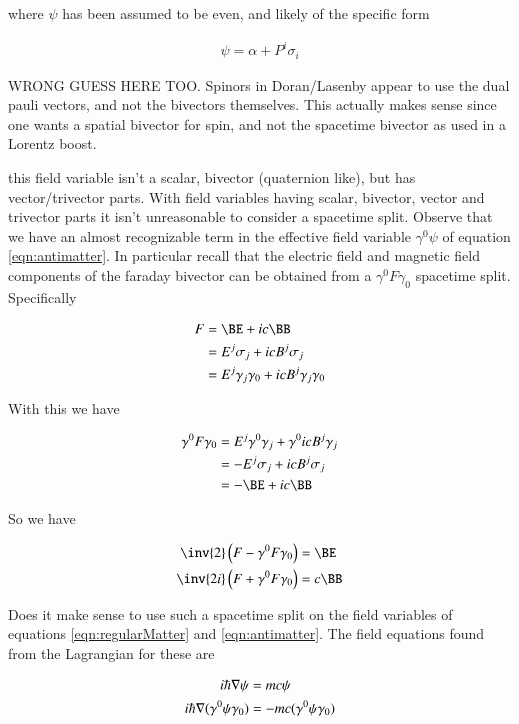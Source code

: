 \documentclass{article}
\begin{document}
where $\psi$ has been assumed to be even, and likely of the specific form

\begin{align*}
\psi = \alpha + P^i \sigma_i
\end{align*}

WRONG GUESS HERE TOO.  Spinors in Doran/Lasenby appear to use the dual pauli vectors, and not the bivectors themselves.  This actually makes sense since one wants a spatial bivector for spin, and not the spacetime bivector as used in a Lorentz boost.

this field variable isn't a scalar, bivector (quaternion like), but has vector/trivector parts.  With field variables having scalar, bivector, vector and trivector parts it isn't unreasonable to consider a spacetime split.  Observe that we have an almost recognizable term in the effective field variable $\gamma^0 \psi$ of
equation \ref{eqn:antimatter}.  In particular recall that the electric field and magnetic field components of the faraday bivector can be obtained from a 
$\gamma^0 F \gamma_0$ spacetime split.  Specifically

\begin{align*}
F 
&= \BE + i c \BB \\
&= E^j \sigma_j + i c B^j \sigma_j \\
&= E^j \gamma_j \gamma_0 + i c B^j \gamma_j \gamma_0 \\
\end{align*}

With this we have

\begin{align*}
\gamma^0 F \gamma_0
&= E^j \gamma^0 \gamma_j + \gamma^0 i c B^j \gamma_j \\
&= -E^j \sigma_j + i c B^j \sigma_j \\
&= -\BE + i c \BB
\end{align*}

So we have

\begin{align*}
\inv{2} \left(F - \gamma^0 F \gamma_0 \right) &= \BE \\
\inv{2i} \left(F + \gamma^0 F \gamma_0 \right) &= c \BB
\end{align*}

Does it make sense to use such a spacetime split on the field variables of equations \ref{eqn:regularMatter} and \ref{eqn:antimatter}.  The field equations
found from the Lagrangian for these are 

\begin{align*}
i \hbar \nabla \psi &= m c \psi \\
i \hbar \nabla (\gamma^0 \psi \gamma_0) &= -m c (\gamma^0 \psi \gamma_0)
\end{align*}
\end{document}

